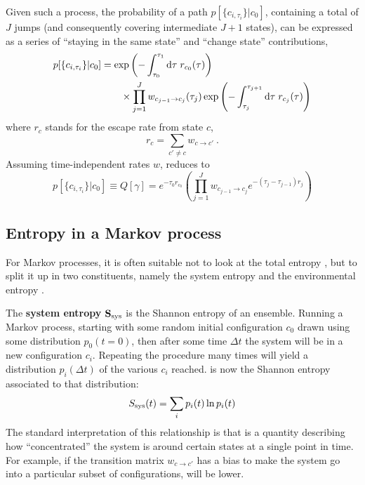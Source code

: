 Given such a process, the probability of a path \(p[\{c_{i,\tau_i}\}|c_0]\), containing a total of \(J\) jumps (and consequently covering intermediate \(J+1\) states), can be expressed as a series of ``staying in the same state'' and ``change state'' contributions, 
%
\begin{equation}
	\begin{split}
	\label{eqn:discrete path probability}
	p[\{c_{i,\tau_i}\} | c_0]
	& = \operatorname{exp}\left(-\int_{\tau_0}^{\tau_1}\mathrm{d}\tau\;r_{c_0}(\tau)\right)
	\\ &\qquad \times
	\prod_{j=1}^J
		w_{c_{j-1}\to c_j}(\tau_j)
		\operatorname{exp}\left(-\int_{\tau_j}^{\tau_{j+1}}\mathrm{d}\tau\;r_{c_j}(\tau)\right)
	\end{split}
\end{equation}
%
where \(r_c\) stands for the escape rate from state \(c\),
%
\begin{equation}
	r_c = \sum_{c'\neq c} w_{c\to c'} ~.
\end{equation}
%
Assuming time-independent rates \(w\),  reduces to
\begin{equation}
	p[\{c_{i,\tau_i}\} | c_0]
	\equiv
	Q[\gamma]
	=
	e^{-\tau_0r_{c_0}} \left(
		\prod_{j = 1}^J
		w_{c_{j-1}\to c_j}
		e^{-(\tau_j-\tau_{j-1})r_j}
		\right)
\end{equation}










\subsection{Entropy in a Markov process}

For Markov processes, it is often suitable not to look at the total entropy \STot{}, but to split it up in two constituents, namely the system entropy \SSys{} and the environmental entropy \SEnv{}.

The \textbf{system entropy} \(\mathbf{S_\text{sys}{}}\) is the Shannon entropy of an ensemble. Running a Markov process, starting with some random initial configuration \(c_0\) drawn using some distribution \(p_0(t=0)\), then after some time \(\Delta t\) the system will be in a new configuration \(c_i\). Repeating the procedure many times will yield a distribution \(p_i(\Delta t)\) of the various \(c_i\) reached. \SSys{} is now the Shannon entropy associated to that distribution:
%
\begin{align}
	S_\text{sys}(t) = \sum_i p_i(t)\ln p_i(t)
\end{align}
%
The standard interpretation of this relationship is that \SSys{} is a quantity describing how ``concentrated'' the system is around certain states at a single point in time. For example, if the transition matrix \(w_{c\to c'}\) has a bias to make the system go into a particular subset of configurations, \SSys will be lower.

